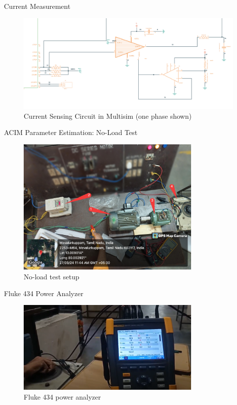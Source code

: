 \begin{frame}{Current Measurement}
	\begin{figure}
		\centering
		\includegraphics[width=\textwidth]{sections/section4/images/PCBDesign/Multisim/MultisimCurrentSensing.png}
		\caption{Current Sensing Circuit in Multisim (one phase shown)}
	\end{figure}
\end{frame}

\begin{frame}{ACIM Parameter Estimation: No-Load Test}
	\begin{figure}
		\centering
		\includegraphics[width=0.8\textwidth]{sections/section5/images/ParamEstim/SetupNoload.jpg}
		\caption{No-load test setup}
	\end{figure}
\end{frame}

\begin{frame}{Fluke 434 Power Analyzer}
	\begin{figure}
		\centering
		\includegraphics[width=0.8\textwidth]{sections/section5/images/ParamEstim/FlukeVoltAmpHertz.png}
		\caption{Fluke 434 power analyzer}
	\end{figure}
\end{frame}

